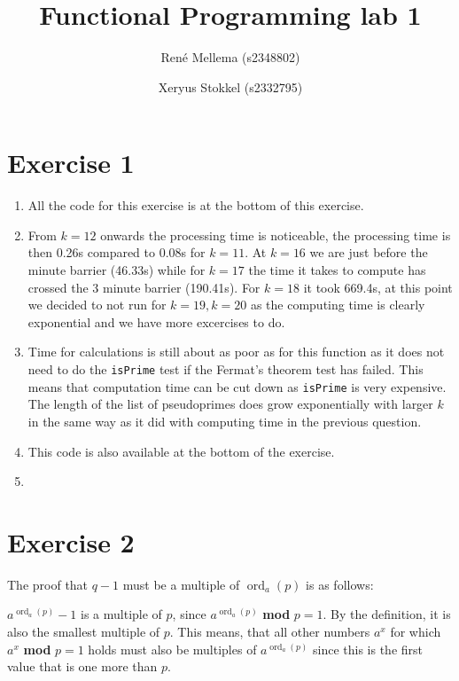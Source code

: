 \documentclass[a4paper]{article}
\title{Functional Programming lab 1}
\author{Ren\'e Mellema (s2348802) \and Xeryus Stokkel (s2332795)}
\DeclareMathOperator*{\ord}{ord}
\begin{document}
\maketitle

\section*{Exercise 1}
\begin{enumerate}
	\item All the code for this exercise is at the bottom of this exercise.
	\item From $k=12$ onwards the processing time is noticeable, the processing time is then 0.26s compared to 0.08s for $k=11$. At $k=16$ we are just before the minute barrier (46.33s) while for $k=17$ the time it takes to compute has crossed the 3 minute barrier (190.41s). For $k=18$ it took 669.4s, at this point we decided to not run for $k=19,k=20$ as the computing time is clearly exponential and we have more excercises to do.
	\item Time for calculations is still about as poor as for this function as it does not need to do the \texttt{isPrime} test if the Fermat's theorem test has failed. This means that computation time can be cut down as \texttt{isPrime} is very expensive. The length of the list of pseudoprimes does grow exponentially with larger $k$ in the same way as it did with computing time in the previous question.
	\item This code is also available at the bottom of the exercise.
	\item 
\end{enumerate}



\section*{Exercise 2}


The proof that $q-1$ must be a multiple of $\ord_a(p)$ is as follows:

$a^{\ord_a(p)} - 1$ is a multiple of $p$, since $a^{\ord_a(p)}$ \textbf{mod} $p=1$. By the definition, it is also the smallest multiple of $p$. This means, that all other numbers $a^x$ for which $a^x$ \textbf{mod} $p=1$ holds must also be multiples of $a^{\ord_a(p)}$ since this is the first value that is one more than $p$. 
\end{document}
